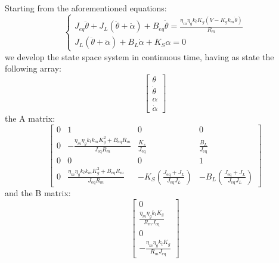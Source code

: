                 Starting from the aforementioned equations:
                \begin{equation*}
                    \begin{cases}
                        J_{eq}\ddot\theta+J_{L}(\ddot\theta+\ddot\alpha) + B_{eq}\dot\theta=\frac{\eta_m\eta_g k_t K_g(V - K_g k_m\dot\theta)}{R_m} \\
                        J_{L}(\ddot\theta+\ddot\alpha)+B_L\dot\alpha +K_{S}\alpha=0
                    \end{cases}
                \end{equation*}
                we develop the state space system in continuous time, having as state the following array:
                \[
                    \left\lbrack \begin{array}{c}
                        \theta \\
                        \dot{\theta} \\
                        \alpha \\
                        \dot{\alpha} 
                        \end{array}\right\rbrack\]
                the A matrix:
                \begin{equation*}
                    \left\lbrack \begin{array}{cccc}
                        0 & 1 & 0 & 0\\
                        0 & -\frac{\eta_m \eta_g k_t k_m K_g^2 +B_{\mathrm{eq}} R_m }{J_{\mathrm{eq}} R_m } & \frac{K_s }{J_{\mathrm{eq}} } & \frac{B_L }{J_{\mathrm{eq}} }\\
                        0 & 0 & 0 & 1\\
                        0 & \frac{\eta_m \eta_g k_t k_m K_g^2 +B_{\mathrm{eq}} R_m }{J_{\mathrm{eq}} R_m } & -K_S \left(\frac{J_{\mathrm{eq}} +J_{L} }{J_{\mathrm{eq}} J_{L} }\right) & -B_L \left(\frac{J_{\mathrm{eq}} +J_{L} }{J_{\mathrm{eq}} J_{L} }\right)
                        \end{array}\right\rbrack 
                \end{equation*}
                and the B matrix:
                \begin{equation*}
                    \left\lbrack \begin{array}{c}
                        0\\
                        \frac{\eta_m \eta_g k_t K_g }{R_m J_{\mathrm{eq}} }\\
                        0\\
                        -\frac{\eta_m \eta_g k_t K_g }{R_m J_{\mathrm{eq}} }
                        \end{array}\right\rbrack
                \end{equation*}

